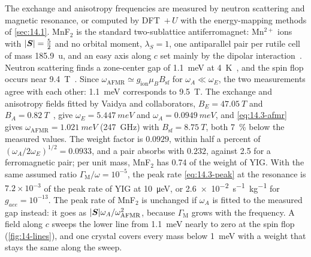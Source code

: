 The exchange and anisotropy frequencies are measured by neutron scattering and magnetic resonance, or computed by DFT~$+\,U$ with the energy-mapping methods of \cref{sec:14.1}. MnF$_2$ is the standard two-sublattice antiferromagnet: Mn$^{2+}$ ions with $|\bm{S}| = \frac52$ and no orbital moment, $\lambda_S = 1$, one antiparallel pair per rutile cell of mass \SI{185.9}{u}, and an easy axis along $c$ set mainly by the dipolar interaction~\cite{bayrakci2013lifetimes}. Neutron scattering finds a zone-center gap of \SI{1.1}{meV} at \SI{4}{K}~\cite{bayrakci2013lifetimes}, and the spin flop occurs near \SI{9.4}{T}~\cite[Fig.~1]{vaidya2020subterahertz}. Since $\omega_{\mathrm{AFMR}} \simeq g_{\mathrm{ion}}\mu_BB_{\mathrm{sf}}$ for $\omega_A \ll \omega_E$, the two measurements agree with each other: \SI{1.1}{meV} corresponds to \SI{9.5}{T}. The exchange and anisotropy fields fitted by Vaidya and collaborators, $B_E = \SI{47.05}{T}$ and $B_A = \SI{0.82}{T}$~\cite{vaidya2020subterahertz}, give $\omega_E = \SI{5.447}{meV}$ and $\omega_A = \SI{0.0949}{meV}$, and \cref{eq:14.3-afmr} gives $\omega_{\mathrm{AFMR}} = \SI{1.021}{meV}$ (\SI{247}{GHz}) with $B_{\mathrm{sf}} = \SI{8.75}{T}$, both \SI{7}{\percent} below the measured values. The weight factor is $0.0929$, within half a percent of $(\omega_A/2\omega_E)^{1/2} = 0.0933$, and a pair absorbs with $0.232$, against 2.5 for a ferromagnetic pair; per unit mass, MnF$_2$ has 0.74 of the weight of YIG. With the same assumed ratio $\varGamma_{\mathrm{M}}/\omega = 10^{-5}$, the peak rate \cref{eq:14.3-peak} at the resonance is $7.2\times10^{-3}$ of the peak rate of YIG at \SI{10}{\micro eV}, or \SI{2.6e-2}{s^{-1}.kg^{-1}} for $g_{aee} = 10^{-13}$. The peak rate of MnF$_2$ is unchanged if $\omega_A$ is fitted to the measured gap instead: it goes as $|\bm{S}|\omega_A/\omega_{\mathrm{AFMR}}^2$, because $\varGamma_{\mathrm{M}}$ grows with the frequency. A field along $c$ sweeps the lower line from \SI{1.1}{meV} nearly to zero at the spin flop (\cref{fig:14-lines}), and one crystal covers every mass below \SI{1}{meV} with a weight that stays the same along the sweep.

